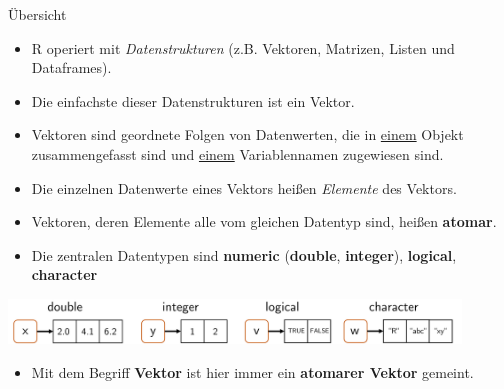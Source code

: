 \documentclass[
  8pt,
  ignorenonframetext,
]{beamer}
\providecommand{\tightlist}{%
  \setlength{\itemsep}{0pt}\setlength{\parskip}{0pt}}\usepackage{longtable,booktabs,array}
\begin{document}
\begin{frame}{Übersicht}
\protect\hypertarget{uxfcbersicht}{}

\small

\begin{itemize}
\item R operiert mit \textit{Datenstrukturen} (z.B. Vektoren, Matrizen, Listen und Dataframes).
\item Die einfachste dieser Datenstrukturen ist ein Vektor.
\item Vektoren sind geordnete Folgen von Datenwerten, die in \underline{einem} Objekt zusammengefasst sind und \underline{einem} Variablennamen zugewiesen sind.
\item Die einzelnen Datenwerte eines Vektors heißen \textit{Elemente} des Vektors.
\item Vektoren, deren Elemente alle vom gleichen Datentyp sind, heißen \textbf{atomar}.
\item Die zentralen Datentypen sind \textbf{numeric} (\textbf{double}, \textbf{integer}),  \textbf{logical},  \textbf{character}
\end{itemize}

\vspace{1mm}

\includegraphics[width=0.9\textwidth,height=\textheight]{../Abbildungen/pds_3_atomic_vectors.pdf}

\begin{itemize}
\tightlist
\item
  Mit dem Begriff \textbf{Vektor} ist hier immer ein \textbf{atomarer
  Vektor} gemeint.
\end{itemize}

\vfill
\end{frame}
\end{document}
